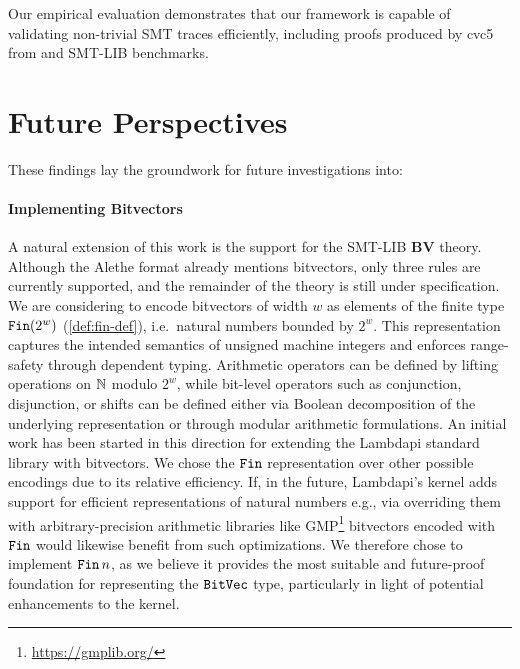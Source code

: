 \bigskip

Our empirical evaluation demonstrates that our framework is capable of validating non-trivial SMT traces efficiently, including proofs produced by cvc5 from \tlaps and SMT-LIB benchmarks.

\section{Future Perspectives}

These findings lay the groundwork for future investigations into:


\paragraph{Implementing Bitvectors}
A natural extension of this work is the support for the SMT-LIB \textbf{BV} theory.
Although the Alethe format already mentions bitvectors, only three rules are currently supported, and the remainder of the theory is still under specification. 
We are considering to encode bitvectors of width $w$ as elements of the finite type $\texttt{\upshape{Fin}}(2^w)$ (\cref{def:fin-def}), i.e.\ natural numbers bounded by $2^w$.
This representation captures the intended semantics of unsigned machine integers and enforces range-safety through dependent typing. 
Arithmetic operators can be defined by lifting operations on $\mathbb{N}$ modulo $2^w$, while bit-level operators such as conjunction, disjunction, or shifts can be defined either via Boolean decomposition of the underlying representation or through modular arithmetic formulations.  
An initial work has been started in this direction for extending the Lambdapi standard library with bitvectors.
We chose the $\texttt{\upshape{Fin}}$ representation over other possible encodings due to its relative efficiency.
If, in the future, Lambdapi's kernel adds support for efficient representations of natural numbers e.g.,
via overriding them with arbitrary-precision arithmetic libraries like GMP\footnote{\url{https://gmplib.org/}} bitvectors encoded with $\texttt{\upshape{Fin}}$ would likewise benefit from such optimizations.
We therefore chose to implement $\texttt{\upshape{Fin}}\,n$, as we believe it provides the most suitable and future-proof foundation for representing the $\texttt{\upshape{BitVec}}$ type,
particularly in light of potential enhancements to the kernel.

